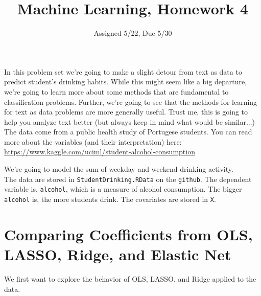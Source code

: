 \documentclass[letterpaper,12pt]{article}
\title{Machine Learning, Homework 4}
\date{Assigned 5/22, Due 5/30}
\numberwithin{equation}{section}
\numberwithin{equation}{section}
\begin{document}
\maketitle


\noindent In this problem set we're going to make a slight detour from text as data to predict student's drinking habits.  While this might seem like a big departure, we're going to learn more about some methods that are fundamental to classification problems.  Further, we're going to see that the methods for learning for text as data problems are more generally useful.  Trust me, this is going to help you analyze text better (but always keep in mind what would be similar...)  The data come from a public health study of Portugese students.  You can read more about the variables (and their interpretation) here: \\

\url{https://www.kaggle.com/uciml/student-alcohol-consumption}

\noindent We're going to model the sum of weekday and weekend drinking activity.    \\

\noindent The data are stored in {\tt StudentDrinking.RData} on the {\tt github}.  The dependent variable is, {\tt alcohol}, which is a measure of alcohol consumption.  The bigger {\tt alcohol} is, the more students drink.  The covariates are stored in {\tt X}.

\section{Comparing Coefficients from OLS, LASSO, Ridge, and Elastic Net}

We first want to explore the behavior of OLS, LASSO, and Ridge applied to the data.
\end{document}
